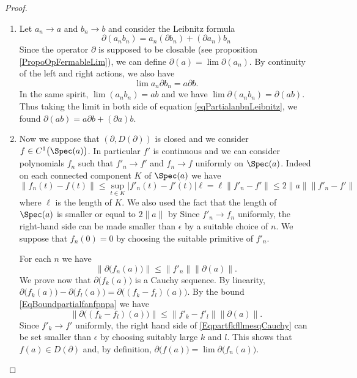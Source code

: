 \begin{proof}
\begin{enumerate}
        \item
            Let \( a_n\to a\) and \( b_n\to b\) and consider the Leibnitz formula
            \begin{equation}        \label{eqPartialanbnLeibnitz}
                \partial(a_nb_n)=a_n(\partial b_n)+(\partial a_n)b_n
            \end{equation}
            Since the operator \( \partial\) is supposed to be closable (see proposition \ref{PropoOpFermableLim}), we can define \( \partial(a)=\lim\partial(a_n)\). By continuity of the left and right actions, we also have
            \begin{equation}
                \lim a_n\partial b_n=a\partial b.
            \end{equation}
            In the same spirit, \( \lim(a_nb_n)=ab\) and we have \( \lim\partial(a_nb_n)=\partial(ab)\). Thus taking the limit in both side of equation \eqref{eqPartialanbnLeibnitz}, we found \( \partial(ab)=a\partial b+(\partial a)b\).
        \item
            Now we suppose that \( (\partial,D(\partial))\) is closed and we consider \( f\in C^1\big( \Spec(a) \big)\). In particular \( f'\) is continuous and we can consider polynomials \( f_n\) such that \( f'_n\to f'\) and \( f_n\to f\) uniformly on \( \Spec(a)\). Indeed on each connected component \( K\) of \( \Spec(a)\) we have
            \begin{equation}
                \| f_n(t)-f(t) \|\leq \sup_{t\in K}| f'_n(t)-f'(t) |\ell=\ell\| f'_n-f' \|\leq 2\| a \|\| f'_n-f' \|
            \end{equation}
            where \( \ell\) is the length of \( K\). We also used the fact that the length of \( \Spec(a)\) is smaller or equal to \( 2\| a \|\) by  Since \( f'_n\to f_n\) uniformly, the right-hand side can be made smaller than \( \epsilon\) by a suitable choice of \( n\). We suppose that \( f_n(0)=0\) by choosing the suitable primitive of \( f'_n\).

            For each \( n\) we have 
            \begin{equation}
                \| \partial\big( f_n(a) \big) \|\leq \| f'_n \|\| \partial(a) \|.
            \end{equation}
            We prove now that \( \partial\big( f_k(a) \big)\) is a Cauchy sequence. By linearity, \( \partial\big( f_k(a) \big)-\partial\big( f_l(a) \big)=\partial\big( (f_k-f_l)(a) \big)\). By the bound \eqref{EqBoundpartialfanfpnpa} we have
            \begin{equation}        \label{EqpartfkfllmesqCauchy}
                \| \partial\big( (f_k-f_l)(a) \big) \|\leq \| f'_k-f'_l \|\| \partial(a) \|.
            \end{equation}
            Since \( f'_k\to f'\) uniformly, the right hand side of \eqref{EqpartfkfllmesqCauchy} can be set smaller than \( \epsilon\) by choosing suitably large \( k\) and \( l\). This shows that \( f(a)\in D(\partial)\) and, by definition, \( \partial\big( f(a) \big)=\lim\partial\big( f_n(a) \big)\).


\end{enumerate}
\end{proof}
